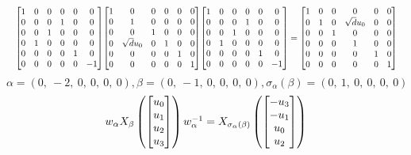 \documentclass[11pt]{article}
\theoremstyle{definition}
\begin{document}
\[
\scaletoalign{\textwidth}{{\left[\begin{matrix}1 & 0 & 0 & 0 & 0 & 0\\0 & 0 & 0 & 1 & 0 & 0\\0 & 0 & 1 & 0 & 0 & 0\\0 & 1 & 0 & 0 & 0 & 0\\0 & 0 & 0 & 0 & 1 & 0\\0 & 0 & 0 & 0 & 0 & -1\end{matrix}\right]} {\left[\begin{matrix}1 & 0 & 0 & 0 & 0 & 0\\0 & 1 & 0 & 0 & 0 & 0\\0 & 0 & 1 & 0 & 0 & 0\\0 & \sqrt{d} u_{0} & 0 & 1 & 0 & 0\\0 & 0 & 0 & 0 & 1 & 0\\0 & 0 & 0 & 0 & 0 & 1\end{matrix}\right]} {\left[\begin{matrix}1 & 0 & 0 & 0 & 0 & 0\\0 & 0 & 0 & 1 & 0 & 0\\0 & 0 & 1 & 0 & 0 & 0\\0 & 1 & 0 & 0 & 0 & 0\\0 & 0 & 0 & 0 & 1 & 0\\0 & 0 & 0 & 0 & 0 & -1\end{matrix}\right]} = {\left[\begin{matrix}1 & 0 & 0 & 0 & 0 & 0\\0 & 1 & 0 & \sqrt{d} u_{0} & 0 & 0\\0 & 0 & 1 & 0 & 0 & 0\\0 & 0 & 0 & 1 & 0 & 0\\0 & 0 & 0 & 0 & 1 & 0\\0 & 0 & 0 & 0 & 0 & 1\end{matrix}\right]}}
\]
\[
\alpha = \left( 0, \  -2, \  0, \  0, \  0, \  0\right), \beta = \left( 0, \  -1, \  0, \  0, \  0, \  0\right), \sigma_{\alpha}(\beta) = \left( 0, \  1, \  0, \  0, \  0, \  0\right)
\]
\[
\scaletoalign{\textwidth}{w_{\alpha} X_{\beta}\left(\left[\begin{matrix}u_{0}\\u_{1}\\u_{2}\\u_{3}\end{matrix}\right]\right) w_{\alpha}^{-1} = X_{\sigma_{\alpha}\left(\beta\right)}\left(\left[\begin{matrix}- u_{3}\\- u_{1}\\u_{0}\\u_{2}\end{matrix}\right]\right)}
\]
\end{document}
